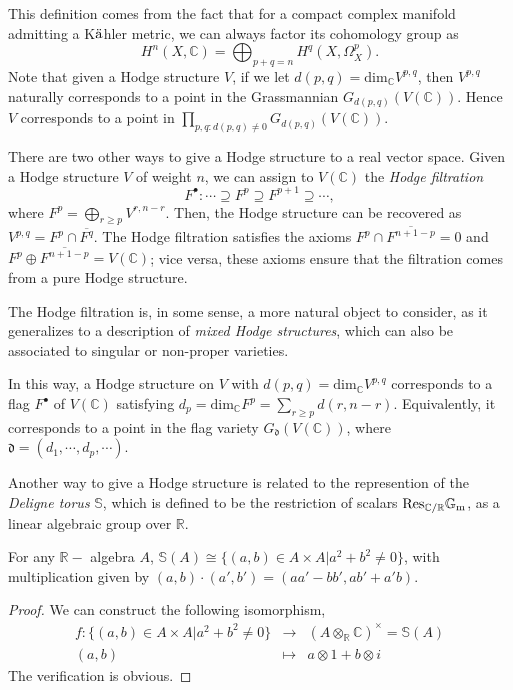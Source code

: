 \begin{remark}
 \label{remark-Hodge-structures}
 This definition comes from the fact that for a compact complex manifold admitting a K$\rm \ddot a$hler metric, we can always factor its cohomology group as
$$
H^n(X, \mathbb C)= \bigoplus _{ p+q=n}H^q(X, \Omega^p_X).
$$
Note that given a Hodge structure $V$, if we let $d(p,q)= \text{dim}_\mathbb C V^{p,q}$, then $V^{p,q}$ naturally corresponds to a point in the Grassmannian $G_{d(p,q)}(V(\mathbb C))$. Hence $V$ corresponds to a point in $\prod_{p,q:d(p,q)\ne 0} G_{d(p,q)}(V(\mathbb C))$.
\end{remark}

There are two other ways to give a Hodge structure to a real vector space. Given a Hodge structure $V$ of weight $n$, we can assign to $V(\mathbb  C)$ the {\it Hodge filtration}
$$
F^ \bullet : \cdots \supseteq F^p \supseteq F^{p+1} \supseteq \cdots,
$$
where $F^p = \bigoplus _{r \geq p} V^{r,n-r}$. Then, the Hodge structure can be recovered as $V^{p,q}=F^p \cap \overline{F^q}$. The Hodge filtration satisfies the axioms $F^p \cap \overline{F^{n+1-p}} = 0$ and $F^p \oplus \overline{F^{n+1-p}} = V(\mathbb C)$; vice versa, these axioms ensure that the filtration comes from a pure Hodge structure.

The Hodge filtration is, in some sense, a more natural object to consider, as it generalizes to a description of \emph{mixed Hodge structures}, which can also be associated to singular or non-proper varieties.

In this way, a Hodge structure on $V$ with $d(p,q)= \text{dim}_\mathbb C V^{p,q}$ corresponds to a flag $F^\bullet$ of $V(\mathbb C)$ satisfying $d_p=\text{dim}_\mathbb C F^p= \sum_{r \ge p} d(r,n-r)$.  Equivalently, it corresponds to a point in the flag variety $G_ \mathfrak d(V(\mathbb C)) $, where $\mathfrak d= (d_1,\cdots,d_p,\cdots)$.

Another way to give a Hodge structure is related to the represention of the {\it Deligne torus} $\mathbb S$, which is defined to be the restriction of scalars $\rm Res_{\mathbb C/ \mathbb R} \mathbb G_m$, as a linear algebraic group over $\mathbb R$.

\begin{lemma}
 \label{lemma-Deligne-torus}
  For any $\mathbb R-$ algebra $A$, $\mathbb S(A)\cong \{(a,b)\in A \times A| a^2+b^2 \ne 0\} $, with multiplication given by $(a,b)\cdot (a',b')=(aa'-bb',ab'+a'b)$.
\end{lemma} 

\begin{proof}
We can construct the following isomorphism, 
\begin{eqnarray*}
f:\{(a,b)\in A \times A| a^2+b^2 \ne 0\} &\to& (A \otimes _\mathbb R \mathbb C)^ \times=\mathbb S(A) \\
(a,b) &\mapsto& a \otimes 1+b\otimes i
\end{eqnarray*}
The verification is obvious.
\end{proof}

